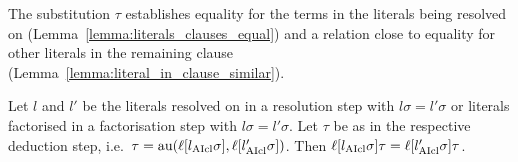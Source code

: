 \documentclass[,%
	paper=a4,%
	DIV14, %
	twoside=false,%
	liststotoc,
	bibtotoc,
	draft=false,%
	numbers=noendperiod
]{scrartcl}
\begin{document}
The substitution $\tau$ establishes equality for the terms in the literals being resolved on (Lemma~\ref{lemma:literals_clauses_equal}) and a relation close to equality for other literals in the remaining clause (Lemma~\ref{lemma:literal_in_clause_similar}).
\begin{lemma}
	\label{lemma:literals_clauses_equal}


	Let $l$ and $l'$ be the literals resolved on in a resolution step with $l\sigma = l'\sigma$ or literals factorised in a factorisation step with $l\sigma = l'\sigma$.
	Let $\tau$ be as in the respective deduction step, i.e.\ $\tau = \operatorname{au}(\ell[l_{\operatorname{AIcl}}\sigma], \ell[l_{\operatorname{AIcl}}'\sigma])$. Then $\ell[l_{\operatorname{AIcl}}\sigma]\tau = \ell[l_{\operatorname{AIcl}}'\sigma]\tau$.
\end{lemma}
\end{document}
